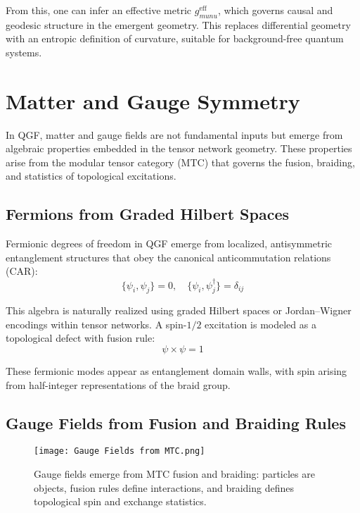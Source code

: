 \documentclass[11pt]{article}
\def\mu{mu}
\def\nu{nu}
\def\frac#1#2{#1/#2}
\begin{document}
From this, one can infer an effective metric \( g_{\mu\nu}^{\text{eff}} \), which governs causal and geodesic structure in the emergent geometry. This replaces differential geometry with an entropic definition of curvature, suitable for background-free quantum systems.



\section{Matter and Gauge Symmetry}

In QGF, matter and gauge fields are not fundamental inputs but emerge from algebraic properties embedded in the tensor network geometry. These properties arise from the modular tensor category (MTC) that governs the fusion, braiding, and statistics of topological excitations.

\subsection{Fermions from Graded Hilbert Spaces}

Fermionic degrees of freedom in QGF emerge from localized, antisymmetric entanglement structures that obey the canonical anticommutation relations (CAR):
\begin{equation}
\{ \psi_i, \psi_j \} = 0, \quad \{ \psi_i, \psi_j^\dagger \} = \delta_{ij}
\end{equation}

This algebra is naturally realized using graded Hilbert spaces or Jordan--Wigner encodings within tensor networks. A spin-\( \frac{1}{2} \) excitation is modeled as a topological defect with fusion rule:
\begin{equation}
\psi \times \psi = 1
\end{equation}

These fermionic modes appear as entanglement domain walls, with spin arising from half-integer representations of the braid group.

\subsection{Gauge Fields from Fusion and Braiding Rules}

\begin{figure}[h!]
\centering
\texttt{[image: Gauge Fields from MTC.png]}
\caption{Gauge fields emerge from MTC fusion and braiding: particles are objects, fusion rules define interactions, and braiding defines topological spin and exchange statistics.}
\label{fig:mtc_gauge}
\end{figure}
\end{document}
